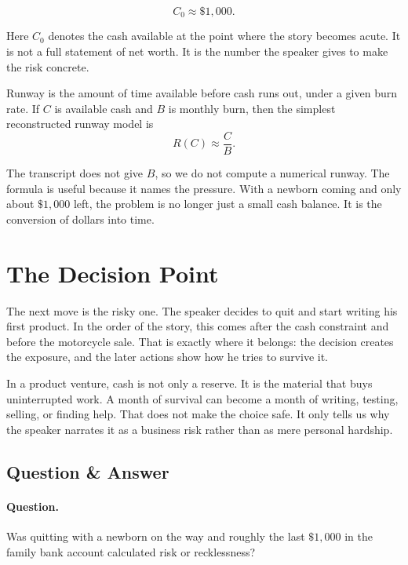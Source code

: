 \begin{equation}
C_0 \approx \$1{,}000 .
\end{equation}

Here \(C_0\) denotes the cash available at the point where the story becomes acute. It is not a full statement of net worth. It is the number the speaker gives to make the risk concrete.

\begin{definition}
Runway is the amount of time available before cash runs out, under a given burn rate. If \(C\) is available cash and \(B\) is monthly burn, then the simplest reconstructed runway model is
\begin{equation}
R(C) \approx \frac{C}{B}.
\end{equation}
\end{definition}

The transcript does not give \(B\), so we do not compute a numerical runway. The formula is useful because it names the pressure. With a newborn coming and only about \(\$1{,}000\) left, the problem is no longer just a small cash balance. It is the conversion of dollars into time.

\section{The Decision Point}

The next move is the risky one. The speaker decides to quit and start writing his first product. In the order of the story, this comes after the cash constraint and before the motorcycle sale. That is exactly where it belongs: the decision creates the exposure, and the later actions show how he tries to survive it.

In a product venture, cash is not only a reserve. It is the material that buys uninterrupted work. A month of survival can become a month of writing, testing, selling, or finding help. That does not make the choice safe. It only tells us why the speaker narrates it as a business risk rather than as mere personal hardship.

\subsection{Question \& Answer}

\paragraph{Question.}
Was quitting with a newborn on the way and roughly the last \(\$1{,}000\) in the family bank account calculated risk or recklessness?

